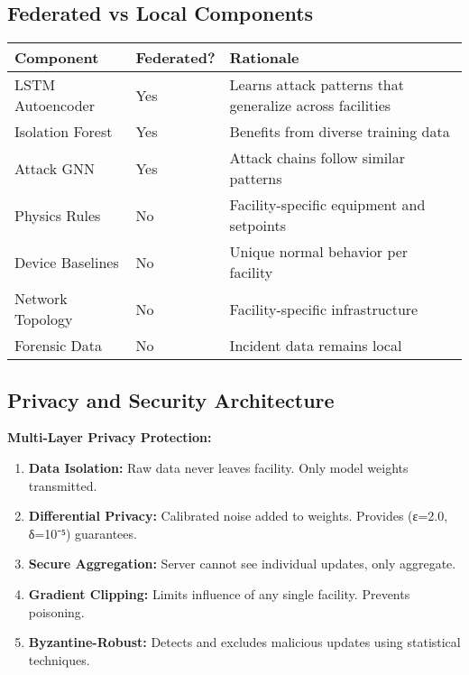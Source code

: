 \documentclass[12pt,a4paper]{article}
\begin{document}
\subsection{Federated vs Local Components}

\begin{center}
\begin{tabular}{|p{3.5cm}|p{2.5cm}|p{5.5cm}|}
\hline
\textbf{Component} & \textbf{Federated?} & \textbf{Rationale}\\
\hline
LSTM Autoencoder & Yes & Learns attack patterns that generalize across facilities\\
\hline
Isolation Forest & Yes & Benefits from diverse training data\\
\hline
Attack GNN & Yes & Attack chains follow similar patterns\\
\hline
Physics Rules & No & Facility-specific equipment and setpoints\\
\hline
Device Baselines & No & Unique normal behavior per facility\\
\hline
Network Topology & No & Facility-specific infrastructure\\
\hline
Forensic Data & No & Incident data remains local\\
\hline
\end{tabular}
\end{center}

\subsection{Privacy and Security Architecture}

\textbf{Multi-Layer Privacy Protection:}
\begin{enumerate}[leftmargin=1cm,itemsep=0pt]
    \item \textbf{Data Isolation:} Raw data never leaves facility. Only model weights transmitted.
    \item \textbf{Differential Privacy:} Calibrated noise added to weights. Provides (ε=2.0, δ=10⁻⁵) guarantees.
    \item \textbf{Secure Aggregation:} Server cannot see individual updates, only aggregate.
    \item \textbf{Gradient Clipping:} Limits influence of any single facility. Prevents poisoning.
    \item \textbf{Byzantine-Robust:} Detects and excludes malicious updates using statistical techniques.
\end{enumerate}
\end{document}
